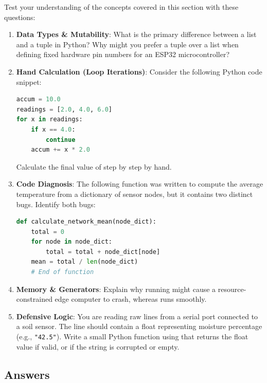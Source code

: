 Test your understanding of the concepts covered in this section with these questions:

\begin{enumerate}
    \item \textbf{Data Types \& Mutability}: What is the primary difference between a list and a tuple in Python? Why might you prefer a tuple over a list when defining fixed hardware pin numbers for an ESP32 microcontroller?
    
    \item \textbf{Hand Calculation (Loop Iterations)}: Consider the following Python code snippet:
\begin{lstlisting}[language=Python]
accum = 10.0
readings = [2.0, 4.0, 6.0]
for x in readings:
    if x == 4.0:
        continue
    accum += x * 2.0
\end{lstlisting}
    Calculate the final value of  step by step by hand.
    
    \item \textbf{Code Diagnosis}: The following function was written to compute the average temperature from a dictionary of sensor nodes, but it contains two distinct bugs. Identify both bugs:
\begin{lstlisting}[language=Python]
def calculate_network_mean(node_dict):
    total = 0
    for node in node_dict:
        total = total + node_dict[node]
    mean = total / len(node_dict)
    # End of function
\end{lstlisting}
    
    \item \textbf{Memory \& Generators}: Explain why running  might cause a resource-constrained edge computer to crash, whereas  runs smoothly.
    
    \item \textbf{Defensive Logic}: You are reading raw lines from a serial port connected to a soil sensor. The line should contain a float representing moisture percentage (e.g., \texttt{"42.5"}). Write a small Python function  using  that returns the float value if valid, or  if the string is corrupted or empty.
\end{enumerate}

\subsection*{Answers}

